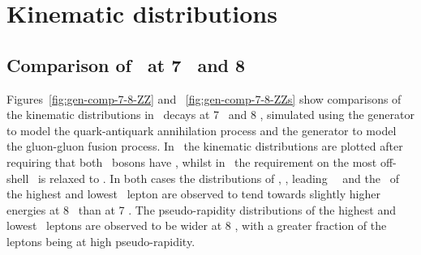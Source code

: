 \section{Kinematic distributions}

\subsection{Comparison of \ZZllll\ at 7 \tev\ and 8 \tev}

Figures~\ref{fig:gen-comp-7-8-ZZ} and ~\ref{fig:gen-comp-7-8-ZZs} show comparisons of the kinematic distributions in \ZZllll\
decays at 7 \tev\ and 8 \tev, simulated using the \powhegbox\cite{Melia:2011tj} generator
to model the quark-antiquark annihilation process and the \ggtwoZZ\cite{gg2ZZ} generator to
model the gluon-gluon fusion process. 
In~ the kinematic
distributions are plotted after requiring that both \Z\ bosons have \sstooos,
whilst in~\fig{gen-comp-7-8-ZZs} the requirement on the most off-shell \Z\ is
relaxed to \mZgtt. In both cases the distributions of \mZZ, \ptZZ, leading \Z\
\pt\ and the \pt\ of the highest and lowest \pt\ lepton are observed to tend towards
slightly higher energies at 8 \tev\ than at 7 \tev. The pseudo-rapidity
distributions of the highest and lowest \pt\ leptons are observed to be wider at
8 \tev, with a greater fraction of the leptons being at high pseudo-rapidity.

